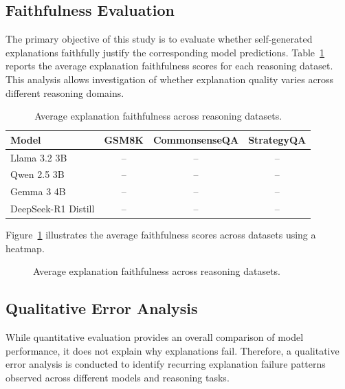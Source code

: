 \documentclass{article}
\begin{document}
\subsection{Faithfulness Evaluation}

The primary objective of this study is to evaluate whether self-generated explanations faithfully justify the corresponding model predictions. Table~\ref{tab:faithfulness_results} reports the average explanation faithfulness scores for each reasoning dataset. This analysis allows investigation of whether explanation quality varies across different reasoning domains.

\begin{table}[t]
\centering
\caption{Average explanation faithfulness across reasoning datasets.}
\label{tab:faithfulness_results}
\begin{tabular}{lccc}
\hline
\textbf{Model} &
\textbf{GSM8K} &
\textbf{CommonsenseQA} &
\textbf{StrategyQA} \\
\hline
Llama 3.2 3B & -- & -- & -- \\
Qwen 2.5 3B & -- & -- & -- \\
Gemma 3 4B & -- & -- & -- \\
DeepSeek-R1 Distill & -- & -- & -- \\
\hline
\end{tabular}
\end{table}

Figure~\ref{fig:faithfulness_heatmap} illustrates the average faithfulness scores across datasets using a heatmap.

\begin{figure}[h]
\centering
{}
\caption{Average explanation faithfulness across reasoning datasets.}
\label{fig:faithfulness_heatmap}
\end{figure}



\subsection{Qualitative Error Analysis}

While quantitative evaluation provides an overall comparison of model performance, it does not explain why explanations fail. Therefore, a qualitative error analysis is conducted to identify recurring explanation failure patterns observed across different models and reasoning tasks.
\end{document}
